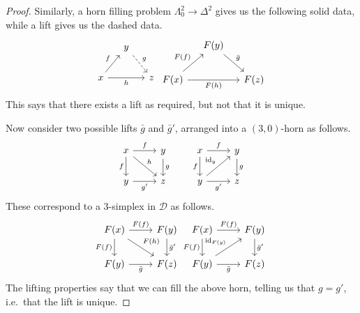\documentclass[main.tex]{subfiles}
\begin{document}
\begin{proof}
  Similarly, a horn filling problem $\Lambda^{2}_{0} \to \Delta^{2}$ gives us the following solid data, while a lift gives us the dashed data.
  \begin{equation*}
    \begin{tikzcd}[column sep=small]
      & y
      \arrow[dr, dashed, "g"]
      \\
      x
      \arrow[ur, "f"]
      \arrow[rr, swap, "h"]
      && z
    \end{tikzcd}
    \begin{tikzcd}[column sep=small]
      & F(y)
      \arrow[dr, "\bar{g}"]
      \\
      F(x)
      \arrow[ur, "F(f)"]
      \arrow[rr, swap, "F(h)"]
      && F(z)
    \end{tikzcd}
  \end{equation*}
  This says that there exists a lift as required, but not that it is unique.

  Now consider two possible lifts $\bar{g}$ and $\bar{g}'$, arranged into a $(3,0)$-horn as follows.
  \begin{equation*}
    \begin{tikzcd}
      x
      \arrow[r, "f"]
      \arrow[d, swap, "f"]
      \arrow[dr, "h"]
      & y
      \arrow[d, "g"]
      \\
      y
      \arrow[r, swap, "g'"]
      & z
    \end{tikzcd}
    \qquad
    \begin{tikzcd}
      x
      \arrow[r, "f"]
      \arrow[d, swap, "f"]
      & y
      \arrow[d, "g"]
      \\
      y
      \arrow[r, swap, "g'"]
      \arrow[ur, "\id_{y}"]
      & z
    \end{tikzcd}
  \end{equation*}
  These correspond to a $3$-simplex in $\mathcal{D}$ as follows.
  \begin{equation*}
    \begin{tikzcd}
      F(x)
      \arrow[r, "F(f)"]
      \arrow[d, swap, "F(f)"]
      \arrow[dr, "F(h)"]
      & F(y)
      \arrow[d, "\bar{g}'"]
      \\
      F(y)
      \arrow[r, swap, "\bar{g}"]
      & F(z)
    \end{tikzcd}
    \begin{tikzcd}
      F(x)
      \arrow[r, "F(f)"]
      \arrow[d, swap, "F(f)"]
      & F(y)
      \arrow[d, "\bar{g}'"]
      \\
      F(y)
      \arrow[ur, "\id_{F(y)}"]
      \arrow[r, swap, "\bar{g}"]
      & F(z)
    \end{tikzcd}
  \end{equation*}
  The lifting properties say that we can fill the above horn, telling us that $g = g'$, i.e.\ that the lift is unique.
\end{proof}
\end{document}
